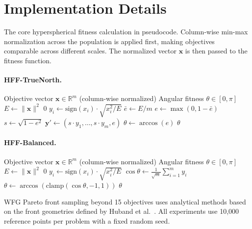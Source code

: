 \documentclass[sigconf]{acmart}
\begin{document}
\appendix

\section{Implementation Details}
\label{app:implementation}

{\small
The core hyperspherical fitness calculation in pseudocode. Column-wise min-max normalization across the population is applied first, making objectives comparable across different scales. The normalized vector $\mathbf{x}$ is then passed to the fitness function.

\paragraph{HFF-TrueNorth.}
\begin{algorithmic}[1]
\REQUIRE Objective vector $\mathbf{x} \in \mathbb{R}^m$ (column-wise normalized)
\ENSURE Angular fitness $\theta \in [0, \pi]$
\STATE $E \gets \|\mathbf{x}\|^2$ 
    \RETURN $0$ 
\ENDIF
\STATE $y_i \gets \mathrm{sign}(x_i) \cdot \sqrt{x_i^2 / E}$ 
\STATE $\bar{e} \gets E / m$ 
\STATE $e \gets \max(0, 1 - \bar{e})$ 
\STATE $s \gets \sqrt{1 - e^2}$ 
\STATE $\mathbf{y}' \gets (s \cdot y_1, \ldots, s \cdot y_m, e)$ 
\STATE $\theta \gets \arccos(e)$
\RETURN $\theta$
\end{algorithmic}

\paragraph{HFF-Balanced.}
\begin{algorithmic}[1]
\REQUIRE Objective vector $\mathbf{x} \in \mathbb{R}^m$ (column-wise normalized)
\ENSURE Angular fitness $\theta \in [0, \pi]$
\STATE $E \gets \|\mathbf{x}\|^2$ 
    \RETURN $0$ 
\ENDIF
\STATE $y_i \gets \mathrm{sign}(x_i) \cdot \sqrt{x_i^2 / E}$ 
\STATE $\cos\theta \gets \frac{1}{\sqrt{m}} \sum_{i=1}^{m} y_i$ 
\STATE $\theta \gets \arccos(\mathrm{clamp}(\cos\theta, -1, 1))$
\RETURN $\theta$
\end{algorithmic}

WFG Pareto front sampling beyond 15 objectives uses analytical methods based on the front geometries defined by Huband et al.~\cite{huband2006review}. All experiments use 10,000 reference points per problem with a fixed random seed.
}



\end{document}
